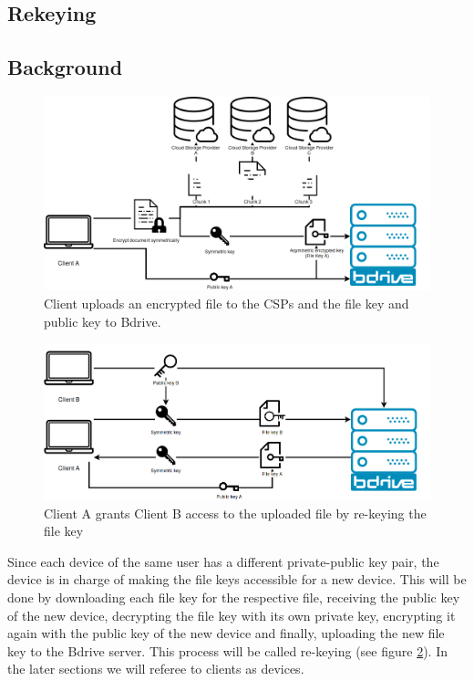 \subsection{Rekeying}
\subsection{Background}
\begin{figure}[!ht]
\centering
    \includegraphics[width=0.8\linewidth]{img/bdrive1.png}\par 
    \caption{Client uploads an encrypted file to the \ac{CSP}s and the file key and public key to Bdrive.}
    \label{fig:filekey}
\end{figure}
\begin{figure}[!ht]
\centering
    \includegraphics[width=0.8\linewidth]{img/bdrive2.png}\par
    \caption{Client A grants Client B access to the uploaded file by re-keying the file key}
    \label{fig:rekey}
\end{figure}
Since each device of the same user has a different private-public key pair, the device is in charge of making the file keys accessible for a new device. This will be done by downloading each file key for the respective file, receiving the public key of the new device, decrypting the file key with its own private key, encrypting it again with the public key of the new device and finally, uploading the new file key to the Bdrive server. This process will be called re-keying (see figure \ref{fig:rekey}). In the later sections we will referee to clients as devices. 

